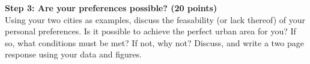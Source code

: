 \documentclass{article}
\begin{document}
\textbf{Step 3: Are your preferences possible? (20 points)}\\
Using your two cities as examples, discuss the feasability (or lack thereof) of your personal preferences.  Is it possible to achieve the perfect urban area for you?  If so, what conditions must be met?  If not, why not?  Discuss, and write a two page response using your data and figures.  




\end{document}
